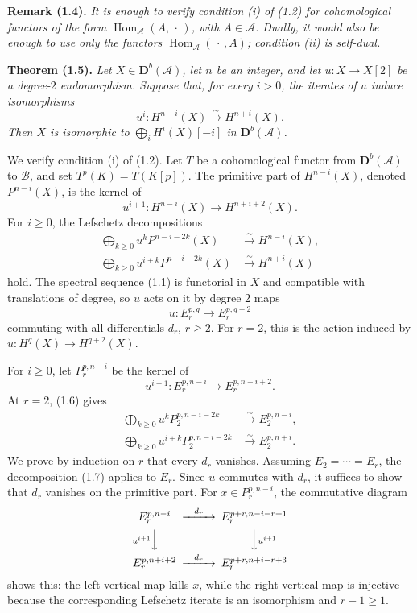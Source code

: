 \documentclass[11pt]{article}
\DeclareMathOperator{\Hom}{Hom}
\newcommand{\bD}{\mathbf D}
\newcommand{\cA}{\mathcal A}
\newcommand{\cB}{\mathcal B}
\newenvironment{named}[1]{\par\medskip\noindent\textbf{#1}\itshape}{\par\medskip}
\begin{document}
\begin{named}{Remark (1.4).}
It is enough to verify condition (i) of (1.2) for cohomological functors of the form $\Hom_\cA(A,\,\cdot\,)$, with $A\in\cA$. Dually, it would also be enough to use only the functors $\Hom_\cA(\,\cdot\,,A)$; condition (ii) is self-dual.
\end{named}

\begin{named}{Theorem (1.5).}
Let $X\in\bD^b(\cA)$, let $n$ be an integer, and let $u:X\to X[2]$ be a degree-$2$ endomorphism. Suppose that, for every $i>0$, the iterates of $u$ induce isomorphisms
\[
u^i:H^{n-i}(X)\xrightarrow{\sim}H^{n+i}(X).
\]
Then $X$ is isomorphic to $\bigoplus_iH^i(X)[-i]$ in $\bD^b(\cA)$.
\end{named}
We verify condition (i) of (1.2). Let $T$ be a cohomological functor from $\bD^b(\cA)$ to $\cB$, and set $T^p(K)=T(K[p])$. The primitive part of $H^{n-i}(X)$, denoted $P^{n-i}(X)$, is the kernel of
\[
u^{i+1}:H^{n-i}(X)\longrightarrow H^{n+i+2}(X).
\]
For $i\ge0$, the Lefschetz decompositions
\begin{align}\tag{1.6}
\bigoplus_{k\ge0}u^k P^{n-i-2k}(X)&\xrightarrow{\sim}H^{n-i}(X),\\
\bigoplus_{k\ge0}u^{i+k} P^{n-i-2k}(X)&\xrightarrow{\sim}H^{n+i}(X)
\end{align}
hold. The spectral sequence (1.1) is functorial in $X$ and compatible with translations of degree, so $u$ acts on it by degree $2$ maps
\[
u:E_r^{p,q}\longrightarrow E_r^{p,q+2}
\]
commuting with all differentials $d_r$, $r\ge2$. For $r=2$, this is the action induced by $u:H^q(X)\to H^{q+2}(X)$.

For $i\ge0$, let $P_r^{p,n-i}$ be the kernel of
\[
u^{i+1}:E_r^{p,n-i}\longrightarrow E_r^{p,n+i+2}.
\]
At $r=2$, (1.6) gives
\begin{align}\tag{1.7}
\bigoplus_{k\ge0}u^kP_2^{p,n-i-2k}&\xrightarrow{\sim}E_2^{p,n-i},\\
\bigoplus_{k\ge0}u^{i+k}P_2^{p,n-i-2k}&\xrightarrow{\sim}E_2^{p,n+i}.
\end{align}
We prove by induction on $r$ that every $d_r$ vanishes. Assuming $E_2=\cdots=E_r$, the decomposition (1.7) applies to $E_r$. Since $u$ commutes with $d_r$, it suffices to show that $d_r$ vanishes on the primitive part. For $x\in P_r^{p,n-i}$, the commutative diagram
\[
\begin{CD}
E_r^{p,n-i} @>{d_r}>> E_r^{p+r,n-i-r+1}\\
@V{u^{i+1}}VV @VV{u^{i+1}}V\\
E_r^{p,n+i+2} @>{d_r}>> E_r^{p+r,n+i-r+3}
\end{CD}
\]
shows this: the left vertical map kills $x$, while the right vertical map is injective because the corresponding Lefschetz iterate is an isomorphism and $r-1\ge1$.
\end{document}
